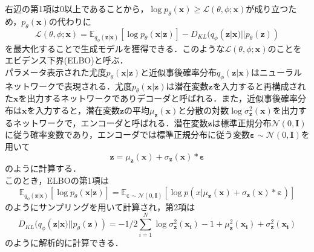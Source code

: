 \documentclass[dvipdfmx]{ampbt_nomag}
\begin{document}
右辺の第1項は0以上であることから，$\log{p_\theta(\boldsymbol{x})} \geq \mathcal{L}(\theta, \phi; \boldsymbol{x})$が成り立つため，$p_\theta(\boldsymbol{x})$の代わりに
\begin{equation} \label{ELBO}
  \mathcal{L}(\theta, \phi; \boldsymbol{x}) = \mathbb{E}_{q_\phi(\boldsymbol{z}|\boldsymbol{x})}[\log{p_\theta(\boldsymbol{x}|\boldsymbol{z})}]-D_{KL}(q_\phi(\boldsymbol{z}|\boldsymbol{x})||p_\theta(\boldsymbol{z}))
\end{equation}
を最大化することで生成モデルを獲得できる．このような$\mathcal{L}(\theta, \phi; \boldsymbol{x})$のことをエビデンス下界(ELBO)と呼ぶ．\\
パラメータ表示された尤度$p_\theta(\boldsymbol{x}|\boldsymbol{z})$と近似事後確率分布$q_\phi(\boldsymbol{z}|\boldsymbol{x})$はニューラルネットワークで表現される．尤度$p_\theta(\boldsymbol{x}|\boldsymbol{z})$は潜在変数$\boldsymbol{z}$を入力すると再構成された$\boldsymbol{x}$を出力するネットワークでありデコーダと呼ばれる．また，近似事後確率分布は$\boldsymbol{x}$を入力すると，潜在変数$\boldsymbol{z}$の平均$\mu_{\boldsymbol{z}}(\boldsymbol{x})$と分散の対数$\log{\sigma_{\boldsymbol{z}}^2(\boldsymbol{x})}$を出力するネットワークで，エンコーダと呼ばれる．潜在変数$\boldsymbol{z}$は標準正規分布$\mathcal{N}(0,\boldsymbol{I})$に従う確率変数であり，エンコーダでは標準正規分布に従う変数$\boldsymbol{\varepsilon} \sim \mathcal{N}(0,\boldsymbol{I})$を用いて
\begin{equation} \label{VAE_latent_val}
\boldsymbol{z} = \mu_{\boldsymbol{z}}(\boldsymbol{x}) + \sigma_{\boldsymbol{z}}(\boldsymbol{x}) * \boldsymbol{\varepsilon}
\end{equation}
のように計算する．\\
このとき，ELBOの第1項は
\begin{equation} \label{ELBO_RHS_1}
  \mathbb{E}_{q_\phi(\boldsymbol{z}|\boldsymbol{x})}[\log{p_\theta(\boldsymbol{x}|\boldsymbol{z})}] = \mathbb{E}_{\boldsymbol{\varepsilon} \sim \mathcal{N}(0,\boldsymbol{I})} [\log{p(x|\mu_{\boldsymbol{z}}(\boldsymbol{x}) + \sigma_{\boldsymbol{z}}(\boldsymbol{x}) * \boldsymbol{\varepsilon})}]
\end{equation}
のようにサンプリングを用いて計算され，第2項は
\begin{equation} \label{ELBO_RHS_2}
  D_{KL}(q_\phi(\boldsymbol{z}|\boldsymbol{x})||p_\theta(\boldsymbol{z})) = -1/2 \sum^N_{i=1}\log{{\sigma_{\boldsymbol{z}}^2(\boldsymbol{x_i})}} - 1 + \mu_{\boldsymbol{z}}^2(\boldsymbol{x_i}) + \sigma_{\boldsymbol{z}}^2(\boldsymbol{x_i})
\end{equation}
のように解析的に計算できる．
\end{document}
